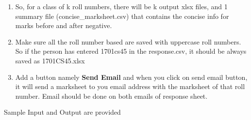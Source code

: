 \documentclass{article}
\begin{document}
\begin{enumerate}
\item So, for a class of k roll numbers, there will be k output xlsx files, 
and 1 summary file (concise\_marksheet.csv) that contains the concise info for 
marks before and after 
negative. 
 
	\item Make sure all the roll number based are saved with uppercase roll 
numbers. So if the person has entered 1701cs45 in the response.csv, it should 
be always saved 
as 1701CS45.xlsx

\item Add a button namely \textbf{Send Email} and when you click on send email 
button, it will send a marksheet to you email address with the marksheet of 
that roll number. Email should be done on both emails of response sheet. 

\end{enumerate}

Sample Input and Output are provided

%
%
%
\end{document}
